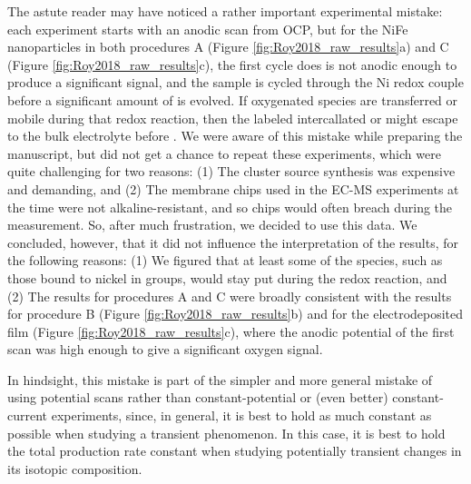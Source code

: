 The astute reader may have noticed a rather important experimental mistake: each experiment starts with an anodic scan from OCP, but for the NiFe nanoparticles in both procedures A (Figure \ref{fig:Roy2018_raw_results}a) and C (Figure \ref{fig:Roy2018_raw_results}c), the first cycle does is not anodic enough to produce a significant  signal, and the sample is cycled through the Ni redox couple before a significant amount of  is evolved. If oxygenated species are transferred or mobile during that redox reaction, then the labeled intercallated  or  might escape to the bulk electrolyte before . We were aware of this mistake while preparing the manuscript, but did not get a chance to repeat these experiments, which were quite challenging for two reasons: (1) The cluster source synthesis was expensive and demanding, and (2) The membrane chips used in the EC-MS experiments at the time were not alkaline-resistant, and so chips would often breach during the measurement. So, after much frustration, we decided to use this data. We concluded, however, that it did not influence the interpretation of the results, for the following reasons: (1) We figured that at least some of the  species, such as those bound to nickel in  groups, would stay put during the redox reaction, and (2) The results for procedures A and C were broadly consistent with the results for procedure B (Figure \ref{fig:Roy2018_raw_results}b) and for the electrodeposited film (Figure \ref{fig:Roy2018_raw_results}c), where the anodic potential of the first scan was high enough to give a significant oxygen signal. 

In hindsight, this mistake is part of the simpler and more general mistake of using potential scans rather than constant-potential or (even better) constant-current experiments, since, in general, it is best to hold as much constant as possible when studying a transient phenomenon. In this case, it is best to hold the total  production rate constant when studying potentially transient changes in its isotopic composition.

